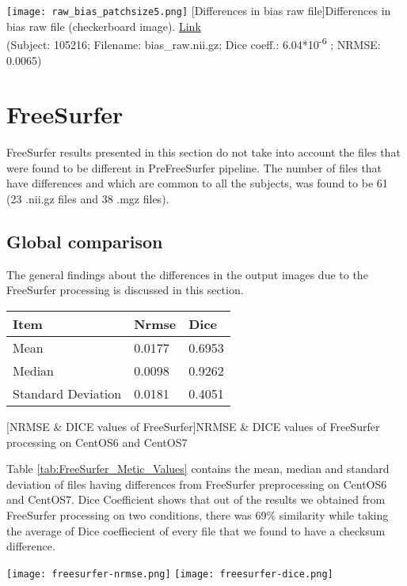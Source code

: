 \begin{center}
\texttt{[image: raw\_bias\_patchsize5.png]}
[Differences in bias raw file]{Differences in bias raw file (checkerboard image). \href{https://drive.google.com/file/d/1rbGR0zGPQsOPzEVkiR6NynudbfjDFLvn/view?usp=sharing}{Link}\\(Subject: 105216; Filename: bias\_raw.nii.gz; Dice coeff.: 6.04*10\textsuperscript{-6} ; NRMSE: 0.0065)}
\label{fig:prefreesurfer_std_file}
\end{center}

\section{FreeSurfer} \label{sec:Freesurfer}
FreeSurfer results presented in this section do not take into account the files that were found to be different in PreFreeSurfer pipeline. The number of files that have differences and which are common to all the subjects, was found to be 61 (23 .nii.gz files and 38 .mgz files).

\subsection{Global comparison}
The general findings about the differences in the output images due to the FreeSurfer processing is discussed in this section.

\begin{center}
\begin{tabular}{|l|l|l|}
\hline
\textbf{Item}      & \textbf{Nrmse} & \textbf{Dice} \\ \hline
Mean               & 0.0177    & 0.6953  \\ \hline
Median             & 0.0098    & 0.9262   \\ \hline
Standard Deviation & 0.0181     & 0.4051   \\ \hline
\end{tabular}
[NRMSE \& DICE values of FreeSurfer]{NRMSE \& DICE values of FreeSurfer processing on CentOS6 and CentOS7}
\label{tab:FreeSurfer_Metic_Values}
\end{center}

Table \ref{tab:FreeSurfer_Metic_Values} contains the mean, median and standard deviation of files having differences from FreeSurfer preprocessing on CentOS6 and CentOS7. Dice Coefficient shows that out of the results we obtained from FreeSurfer processing on two conditions, there was 69\% similarity while taking the average of Dice coeffiecient of every file that we found to have a checksum difference.
\begin{center}
\texttt{[image: freesurfer-nrmse.png]}%
\texttt{[image: freesurfer-dice.png]}
\caption*{(i) NRMSE (left) (ii)Dice Coefficient (right)}
\label{fig:freesurfer_metric_values}
\end{center}


